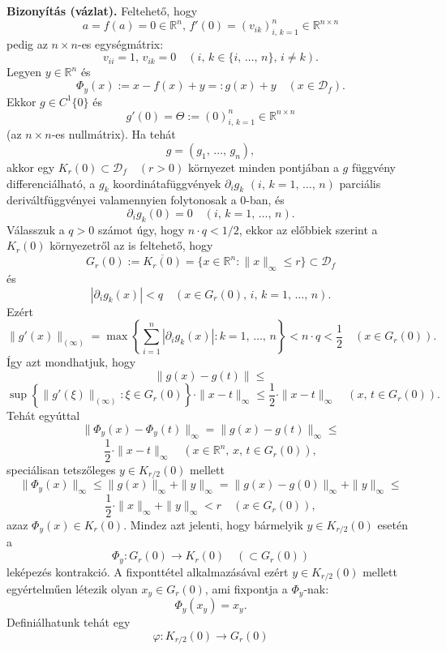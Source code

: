 \documentclass[12pt]{article}
\newcommand{\R}{\mathbb{R}}
\newcommand{\D}{\mathcal{D}_f}
\begin{document}
    \textbf{Bizonyítás (vázlat).} Feltehető, hogy
    \[
        a = f(a) = 0 \in \R^n, \, f'(0) = (v_{ik})_{i, \, k = 1}^n \in \R^{n \times n}
    \]
    pedig az $n \times n$-es egységmátrix:
    \[
        v_{ii} = 1, \, v_{ik} = 0 \quad (i, \, k \in \{ i, \, \dots, \, n \}, \, i \neq k).
    \]
    Legyen $y \in \R^n$ és
    \[
        \Phi_y(x) := x - f(x) + y =: g(x) + y \quad (x \in \D).
    \]
    Ekkor $g \in C^1\{0\}$ és
    \[
        g'(0) = \Theta := (0)^n_{i, \, k = 1} \in \R^{n \times n}
    \]
    (az $n \times n$-es nullmátrix). Ha tehát
    \[
        g = (g_1, \, \dots, \, g_n),
    \]
    akkor egy $K_r(0) \subset \D \quad (r > 0)$ környezet minden pontjában a $g$ függvény differenciálható, a $g_k$ koordinátafüggvények $\partial_i g_k$ $(i, \, k = 1, \, \dots, \, n)$ parciális deriváltfüggvényei valamennyien folytonosak a $0$-ban, és
    \[
        \partial_i g_k(0) = 0 \quad (i, \, k = 1, \, \dots, \, n).
    \]
    Válasszuk a $q > 0$ számot úgy, hogy $n \cdot q < 1 / 2$, ekkor az előbbiek szerint a $K_r(0)$ környezetről az is feltehető, hogy
    \[
        G_r(0) := \overline{K_r(0)} = \{ x \in \R^n : \|x\|_\infty \leq r \} \subset \D
    \]
    és
    \[
        |\partial_i g_k(x)| < q \quad (x \in G_r(0), \, i, \, k = 1, \, \dots, \, n).
    \]
    Ezért
    \[
        \|g'(x)\|_{(\infty)} = \max \left\{ \sum_{i=1}^n |\partial_i g_k(x)| : k = 1, \, \dots, \, n \right\} < n \cdot q < \frac{1}{2} \quad (x \in G_r(0)).
    \]
    Így azt mondhatjuk, hogy
    \[
        \| g(x) - g(t) \| \leq
    \]
    \[
        \sup \left\{ \|g'(\xi)\|_{(\infty)} : \xi \in G_r(0) \right\} \cdot \|x-t\|_\infty \leq \frac{1}{2} \cdot \|x-t\|_\infty \quad (x, \, t \in G_r(0)).
    \]
    Tehát egyúttal
    \[  
        \| \Phi_y(x) - \Phi_y(t)\|_\infty = \|g(x) - g(t)\|_\infty \leq
    \]
    \[
        \frac{1}{2} \cdot \|x-t\|_\infty \quad (x \in \R^n, \, x, \, t \in G_r(0)),
    \]
    speciálisan tetszőleges $y \in K_{r/2}(0)$ mellett
    \[
        \| \Phi_y(x) \|_\infty \leq \|g(x)\|_\infty + \|y\|_\infty = \|g(x) - g(0)\|_\infty + \|y\|_\infty \leq
    \]
    \[
        \frac{1}{2} \cdot \|x\|_\infty + \|y\|_\infty < r \quad (x \in G_r(0)),
    \]
    azaz $\Phi_y(x) \in K_r(0)$. Mindez azt jelenti, hogy bármelyik $y \in K_{r/2}(0)$ esetén a
    \[
        \Phi_y : G_r(0) \to K_r(0) \quad (\subset G_r(0))
    \]
    leképezés kontrakció. A fixponttétel alkalmazásával ezért $y \in K_{r/2}(0)$ mellett egyértelműen létezik olyan $x_y \in G_r(0)$, ami fixpontja a $\Phi_y$-nak:
    \[
        \Phi_y(x_y) = x_y.
    \]
    Definiálhatunk tehát egy
    \[
        \varphi : K_{r/2}(0) \to G_r(0)
    \]
\end{document}
